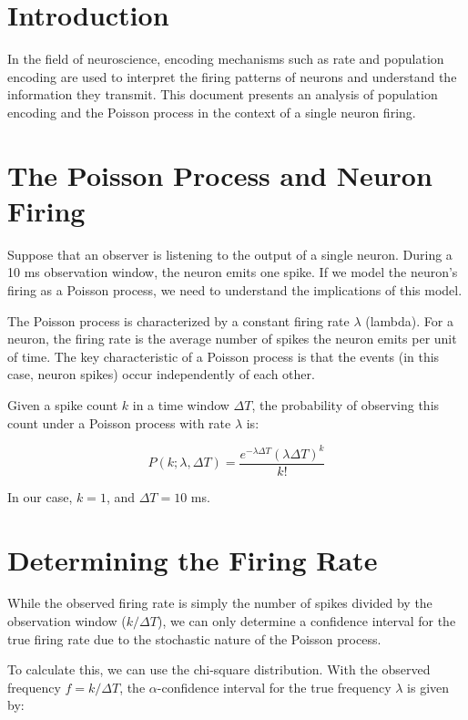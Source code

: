 \section{Introduction}

In the field of neuroscience, encoding mechanisms such as rate and population encoding are used to interpret the firing patterns of neurons and understand the information they transmit. This document presents an analysis of population encoding and the Poisson process in the context of a single neuron firing.

\section{The Poisson Process and Neuron Firing}

Suppose that an observer is listening to the output of a single neuron. During a 10 ms observation window, the neuron emits one spike. If we model the neuron's firing as a Poisson process, we need to understand the implications of this model. 

The Poisson process is characterized by a constant firing rate $\lambda$ (lambda). For a neuron, the firing rate is the average number of spikes the neuron emits per unit of time. The key characteristic of a Poisson process is that the events (in this case, neuron spikes) occur independently of each other. 

Given a spike count $k$ in a time window $\Delta T$, the probability of observing this count under a Poisson process with rate $\lambda$ is:

\begin{equation}
P(k; \lambda, \Delta T) = \frac{e^{-\lambda \Delta T} (\lambda \Delta T)^k}{k!}
\end{equation}

In our case, $k = 1$, and $\Delta T = 10$ ms.

\section{Determining the Firing Rate}

While the observed firing rate is simply the number of spikes divided by the observation window ($k/\Delta T$), we can only determine a confidence interval for the true firing rate due to the stochastic nature of the Poisson process.

To calculate this, we can use the chi-square distribution. With the observed frequency $f = k/\Delta T$, the $\alpha$-confidence interval for the true frequency $\lambda$ is given by:


